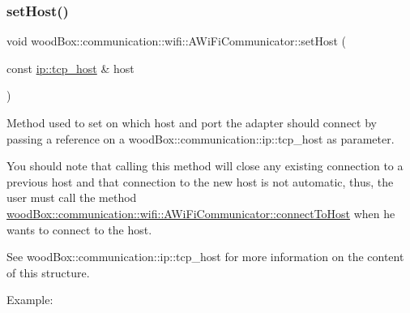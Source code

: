 \subsubsection{\texorpdfstring{set\+Host()}{setHost()}}
{\footnotesize\ttfamily void wood\+Box\+::communication\+::wifi\+::\+A\+Wi\+Fi\+Communicator\+::set\+Host (\begin{DoxyParamCaption}\item[{const \mbox{\hyperlink{structwood_box_1_1communication_1_1ip_1_1s__host}{ip\+::tcp\+\_\+host}} \&}]{host }\end{DoxyParamCaption})}

Method used to set on which host and port the adapter should connect by passing a reference on a wood\+Box\+::communication\+::ip\+::tcp\+\_\+host as parameter.

You should note that calling this method will close any existing connection to a previous host and that connection to the new host is not automatic, thus, the user must call the method \mbox{\hyperlink{classwood_box_1_1communication_1_1wifi_1_1_a_wi_fi_communicator_ad8c31be391a58bfabe21c5ef99a94719}{wood\+Box\+::communication\+::wifi\+::\+A\+Wi\+Fi\+Communicator\+::connect\+To\+Host}} when he wants to connect to the host.

See wood\+Box\+::communication\+::ip\+::tcp\+\_\+host for more information on the content of this structure.

Example\+:


